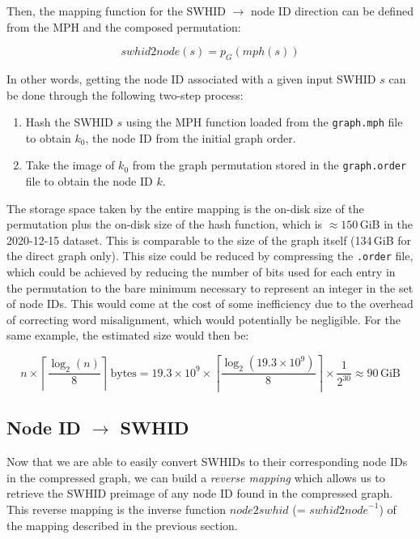 Then, the mapping function for the \gls{SWHID} $\to$ node ID direction can be
defined from the \gls{MPH} and the composed permutation:

\[\mathit{swhid2node}(s) = p_G(\mathit{mph}(s))\]

In other words, getting the node ID associated with a given input \gls{SWHID}
$s$ can be done through the following two-step process:

\begin{enumerate}
    \item Hash the \gls{SWHID} $s$ using the \gls{MPH} function loaded from the
        \texttt{graph.mph} file to obtain $k_0$, the node ID from the initial
        graph order.
    \item Take the image of $k_0$ from the graph permutation stored in the
        \texttt{graph.order} file to obtain the node ID $k$.
\end{enumerate}

The storage space taken by the entire mapping is the on-disk size of the
permutation plus the on-disk size of the hash function, which is $\approx
150$\,GiB in the 2020-12-15 dataset. This is comparable to the size of the
graph itself (134\,GiB for the direct graph only). This size could be reduced
by compressing the \texttt{.order} file, which could be achieved by reducing
the number of bits used for each entry in the permutation to the bare minimum
necessary to represent an integer in the set of node IDs. This would come at
the cost of some inefficiency due to the overhead of correcting word
misalignment, which would potentially be negligible.
For the same example, the estimated size would then be:

\[
    n \times \left\lceil{\frac{\log_2(n)}{8}}\right\rceil\,\mathrm{bytes}
    = 19.3 \times 10^9 \times
        \left\lceil{\frac{\log_2(19.3 \times 10^9)}{8}}\right\rceil
        \times \frac{1}{2^{30}}
    \approx 90\,\mathrm{GiB}
\]

\subsection{Node ID $\to$ SWHID}%
\label{sec:node2swhid}

Now that we are able to easily convert \glspl{SWHID} to their corresponding
node IDs in the compressed graph, we can build a \emph{reverse mapping} which
allows us to retrieve the \gls{SWHID} preimage of any node ID found in the
compressed graph. This reverse mapping is the inverse function
$\mathit{node2swhid}$ (= $\mathit{swhid2node}^{-1}$) of the mapping
described in the previous section.

